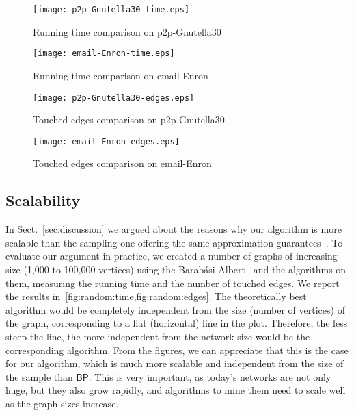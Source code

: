 \begin{figure*}[ht]
\begin{minipage}[b]{0.5\linewidth}
\flushleft
\texttt{[image: p2p-Gnutella30-time.eps]}
\caption{Running time comparison on p2p-Gnutella30} \label{fig:gnutella:time}
\end{minipage}%
\begin{minipage}[b]{0.5\linewidth}
\centering
\texttt{[image: email-Enron-time.eps]}
\caption{Running time comparison on email-Enron} \label{fig:email:time}
\end{minipage}
\end{figure*}
\begin{figure*}[ht]
\begin{minipage}[b]{0.5\linewidth}
\flushleft
\texttt{[image: p2p-Gnutella30-edges.eps]}
\caption{Touched edges comparison on p2p-Gnutella30} \label{fig:gnutella:edges}
\end{minipage}%
\begin{minipage}[b]{0.5\linewidth}
\centering
\texttt{[image: email-Enron-edges.eps]}
\caption{Touched edges comparison on email-Enron}\label{fig:email:edges}
\end{minipage}
\end{figure*}

\subsection{Scalability}\label{sec:scalability}
In Sect.~\ref{sec:discussion} we argued about the reasons why our algorithm is
more scalable than the sampling one offering the same approximation
guarantees~\citep{BrandesP07,GeisbergerSS08,JacobKLPT05}. To evaluate our
argument in practice, we created a number of graphs of increasing size (1,000 to
100,000 vertices) using the Barab\'asi-Albert~\citep{BarabasiA99} and the
algorithms on them, measuring the running time and the number of touched
edges. We report the results in~\cref{fig:random:time,fig:random:edges}. The
theoretically best algorithm would be completely independent from the size
(number of vertices) of the graph, corresponding to a flat (horizontal) line in
the plot. Therefore, the less steep the line, the more independent from the
network size would be the corresponding algorithm. From the figures, we can
appreciate that this is the case for our algorithm, which is much more scalable
and independent from the size of the sample than $\mathsf{BP}$. This is very
important, as today's networks are not only huge, but they also grow rapidly,
and algorithms to mine them need to scale well as the graph sizes increase.


